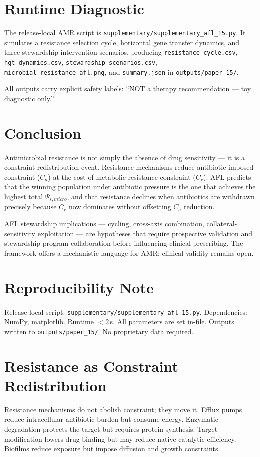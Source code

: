 \documentclass[11pt]{article}
\begin{document}
\section{Runtime Diagnostic}

The release-local AMR script is \texttt{supplementary/supplementary\_afl\_15.py}. It simulates a resistance selection cycle, horizontal gene transfer dynamics, and three stewardship intervention scenarios, producing \texttt{resistance\_cycle.csv}, \texttt{hgt\_dynamics.csv}, \texttt{stewardship\_scenarios.csv}, \texttt{microbial\_resistance\_afl.png}, and \texttt{summary.json} in \texttt{outputs/paper\_15/}.

All outputs carry explicit safety labels: ``NOT a therapy recommendation --- toy diagnostic only.''

\section{Conclusion}

Antimicrobial resistance is not simply the absence of drug sensitivity --- it is a constraint redistribution event. Resistance mechanisms reduce antibiotic-imposed constraint ($C_a$) at the cost of metabolic resistance constraint ($C_r$). AFL predicts that the winning population under antibiotic pressure is the one that achieves the highest total $\Psi_{s,micro}$, and that resistance declines when antibiotics are withdrawn precisely because $C_r$ now dominates without offsetting $C_a$ reduction.

AFL stewardship implications --- cycling, cross-axis combination, collateral-sensitivity exploitation --- are hypotheses that require prospective validation and stewardship-program collaboration before influencing clinical prescribing. The framework offers a mechanistic language for AMR; clinical validity remains open.

\section{Reproducibility Note}

Release-local script: \texttt{supplementary/supplementary\_afl\_15.py}. Dependencies: NumPy, matplotlib. Runtime $< 2$\,s. All parameters are set in-file. Outputs written to \texttt{outputs/paper\_15/}. No proprietary data required.



\section{Resistance as Constraint Redistribution}
Resistance mechanisms do not abolish constraint; they move it. Efflux pumps reduce intracellular antibiotic burden but consume energy. Enzymatic degradation protects the target but requires protein synthesis. Target modification lowers drug binding but may reduce native catalytic efficiency. Biofilms reduce exposure but impose diffusion and growth constraints.
\end{document}
